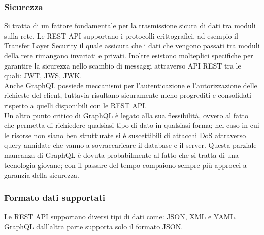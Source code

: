 \subsubsection*{Sicurezza}
Si tratta di un fattore fondamentale per la trasmissione sicura di dati tra moduli sulla rete. Le REST API supportano i protocolli crittografici, ad esempio il Transfer Layer Security il quale assicura che i dati che vengono passati tra moduli della rete rimangano invariati e privati. Inoltre esistono molteplici specifiche per garantire la sicurezza nello scambio di messaggi attraverso API REST tra le quali: JWT, JWS, JWK.\\
Anche GraphQL possiede meccanismi per l'autenticazione e l'autorizzazione delle richieste del client, tuttavia risultano sicuramente meno progrediti e consolidati rispetto a quelli disponibili con le REST API.\\
Un altro punto critico di GraphQL è legato alla sua flessibilità, ovvero al fatto che permetta di richiedere qualsiasi tipo di dato in qualsiasi forma; nel caso in cui le risorse non siano ben strutturate si è suscettibili di attacchi DoS attraverso query annidate che vanno a sovraccaricare il database e il server. Questa parziale mancanza di GraphQL è dovuta probabilmente al fatto che si tratta di una tecnologia giovane; con il passare del tempo compaiono sempre più approcci a garanzia della sicurezza.
\subsubsection*{Formato dati supportati}
Le REST API supportano diversi tipi di dati come: JSON, XML e YAML. GraphQL dall'altra parte supporta solo il formato JSON.
